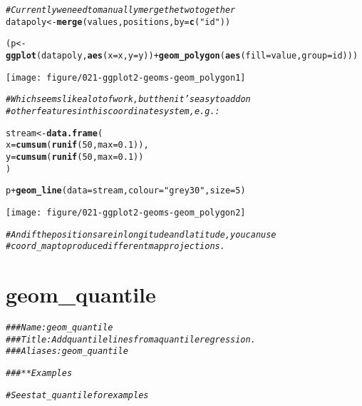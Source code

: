 \documentclass[a4paper,titlepage]{tufte-handout}\usepackage[]{graphicx}\usepackage[]{color}
\makeatletter
\def\maxwidth{ %
  \ifdim\Gin@nat@width>\linewidth
    \linewidth
  \else
    \Gin@nat@width
  \fi
}
\newcommand{\hlnum}[1]{\textcolor[rgb]{0.686,0.059,0.569}{#1}}%
\newcommand{\hlstr}[1]{\textcolor[rgb]{0.192,0.494,0.8}{#1}}%
\newcommand{\hlcom}[1]{\textcolor[rgb]{0.678,0.584,0.686}{\textit{#1}}}%
\newcommand{\hlopt}[1]{\textcolor[rgb]{0,0,0}{#1}}%
\newcommand{\hlstd}[1]{\textcolor[rgb]{0.345,0.345,0.345}{#1}}%
\newcommand{\hlkwb}[1]{\textcolor[rgb]{0.69,0.353,0.396}{#1}}%
\newcommand{\hlkwc}[1]{\textcolor[rgb]{0.333,0.667,0.333}{#1}}%
\newcommand{\hlkwd}[1]{\textcolor[rgb]{0.737,0.353,0.396}{\textbf{#1}}}%
\newenvironment{kframe}{%
 \def\at@end@of@kframe{}%
 \ifinner\ifhmode%
  \def\at@end@of@kframe{\end{minipage}}%
  \begin{minipage}{\columnwidth}%
 \fi\fi%
 \def\FrameCommand##1{\hskip\@totalleftmargin \hskip-\fboxsep
 \colorbox{shadecolor}{##1}\hskip-\fboxsep
     \hskip-\linewidth \hskip-\@totalleftmargin \hskip\columnwidth}%
 \MakeFramed {\advance\hsize-\width
   \@totalleftmargin\z@ \linewidth\hsize
   \@setminipage}}%
 {\par\unskip\endMakeFramed%
 \at@end@of@kframe}
\newenvironment{knitrout}{}{} %
\makeatother
\begin{document}
\begin{knitrout}
\begin{kframe}
\begin{alltt}
\hlcom{# Currently we need to manually merge the two together}
\hlstd{datapoly} \hlkwb{<-} \hlkwd{merge}\hlstd{(values, positions,} \hlkwc{by}\hlstd{=}\hlkwd{c}\hlstd{(}\hlstr{"id"}\hlstd{))}

\hlstd{(p} \hlkwb{<-} \hlkwd{ggplot}\hlstd{(datapoly,} \hlkwd{aes}\hlstd{(}\hlkwc{x}\hlstd{=x,} \hlkwc{y}\hlstd{=y))} \hlopt{+} \hlkwd{geom_polygon}\hlstd{(}\hlkwd{aes}\hlstd{(}\hlkwc{fill}\hlstd{=value,} \hlkwc{group}\hlstd{=id)))}
\end{alltt}
\end{kframe}
\texttt{[image: figure/021-ggplot2-geoms-geom\_polygon1]} 
\begin{kframe}\begin{alltt}
\hlcom{# Which seems like a lot of work, but then it's easy to add on}
\hlcom{# other features in this coordinate system, e.g.:}

\hlstd{stream} \hlkwb{<-} \hlkwd{data.frame}\hlstd{(}
  \hlkwc{x} \hlstd{=} \hlkwd{cumsum}\hlstd{(}\hlkwd{runif}\hlstd{(}\hlnum{50}\hlstd{,} \hlkwc{max} \hlstd{=} \hlnum{0.1}\hlstd{)),}
  \hlkwc{y} \hlstd{=} \hlkwd{cumsum}\hlstd{(}\hlkwd{runif}\hlstd{(}\hlnum{50}\hlstd{,}\hlkwc{max} \hlstd{=} \hlnum{0.1}\hlstd{))}
\hlstd{)}

\hlstd{p} \hlopt{+} \hlkwd{geom_line}\hlstd{(}\hlkwc{data} \hlstd{= stream,} \hlkwc{colour}\hlstd{=}\hlstr{"grey30"}\hlstd{,} \hlkwc{size} \hlstd{=} \hlnum{5}\hlstd{)}
\end{alltt}
\end{kframe}
\texttt{[image: figure/021-ggplot2-geoms-geom\_polygon2]} 
\begin{kframe}\begin{alltt}
\hlcom{# And if the positions are in longitude and latitude, you can use}
\hlcom{# coord_map to produce different map projections.}
\end{alltt}
\end{kframe}
\end{knitrout}



\section{geom\_quantile}

\begin{knitrout}
\color{fgcolor}\begin{kframe}
\begin{alltt}
\hlcom{### Name: geom_quantile}
\hlcom{### Title: Add quantile lines from a quantile regression.}
\hlcom{### Aliases: geom_quantile}

\hlcom{### ** Examples}

\hlcom{# See stat_quantile for examples}
\end{alltt}
\end{kframe}
\end{knitrout}
\end{document}
